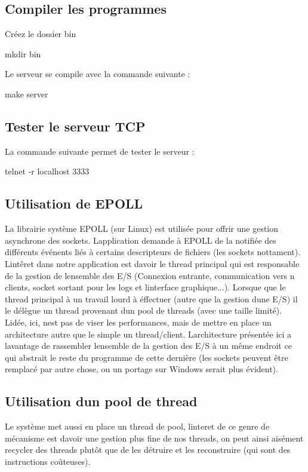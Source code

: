 \subsection*{Compiler les programmes}

Créez le dossier bin

{\ttfamily mkdir bin}

Le serveur se compile avec la commande suivante \+:

{\ttfamily make server}

\subsection*{Tester le serveur T\+CP}

La commande suivante permet de tester le serveur \+:

{\ttfamily telnet -\/r localhost 3333}

\subsection*{Utilisation de E\+P\+O\+LL}

La librairie système E\+P\+O\+LL (sur Linux) est utilisée pour offrir une gestion asynchrone des sockets. L\textquotesingle{}application demande à E\+P\+O\+LL de la notifiée des différents événents liés à certains descripteurs de fichiers (les sockets nottament). L\textquotesingle{}intêret dans notre application est d\textquotesingle{}avoir le thread principal qui est responsable de la gestion de l\textquotesingle{}ensemble des E/S (Connexion entrante, communication vers n clients, socket sortant pour les logs et l\textquotesingle{}interface graphique...). Lorsque que le thread principal à un travail lourd à éffectuer (autre que la gestion d\textquotesingle{}une E/S) il le délègue un thread provenant d\textquotesingle{}un pool de threads (avec une taille limité). L\textquotesingle{}idée, ici, n\textquotesingle{}est pas de viser les performances, mais de mettre en place un architecture autre que le simple un thread/client. L\textquotesingle{}architecture présentée ici a l\textquotesingle{}avantage de rassembler l\textquotesingle{}ensemble de la gestion des E/S à un même endroit ce qui abstrait le reste du programme de cette dernière (les sockets peuvent être remplacé par autre chose, ou un portage sur Windows serait plus évident).

\subsection*{Utilisation d\textquotesingle{}un pool de thread}

Le système met aussi en place un thread de pool, l\textquotesingle{}interet de ce genre de mécanisme est d\textquotesingle{}avoir une gestion plus fine de nos threads, on peut ainsi aisément recycler des threads plutôt que de les détruire et les reconstruire (qui sont des instructions coûteuses). 